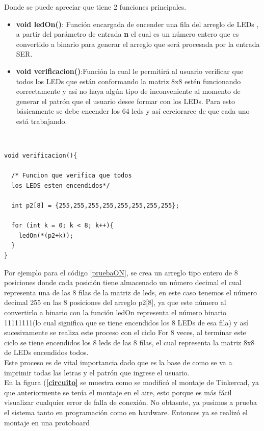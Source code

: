 \documentclass{article}
\begin{document}
Donde se puede apreciar que tiene 2 funciones principales.

\begin{itemize}
    \item \textbf{ void ledOn()}: Función encargada de encender una fila del arreglo de LEDs , a partir del parámetro de entrada \textbf{n} el cual es un número entero que es convertido a binario para generar el arreglo que será procesada por la entrada SER.
    \item \textbf{void verificacion()}:Función la cual le permitirá al usuario verificar que todos los LEDs que están conformando la matriz 8x8 estén funcionando correctamente  y así no haya algún tipo de inconveniente al momento de generar el patrón que el usuario desee formar con los LEDs. Para esto básicamente se debe encender los 64 leds y así cerciorarce de que  cada uno está trabajando.
    
\end{itemize}
\\

\begin{lstlisting}[language=arduino, label=pruebaON]
void verificacion(){ 
  
  /* Funcion que verifica que todos 
  los LEDS esten encendidos*/
  
  int p2[8] = {255,255,255,255,255,255,255,255};
  
  for (int k = 0; k < 8; k++){
    ledOn(*(p2+k));
  }
}
\end{lstlisting}

Por ejemplo para el código \ref{pruebaON}, se crea un arreglo tipo entero de 8 posiciones donde cada posición tiene almacenado un número decimal el cual representa una de las 8 filas de la matriz de leds, en este caso tenemos el número decimal 255 en las 8 posiciones del arreglo p2[8], ya que este número al convertirlo a binario con la función ledOn  representa el número binario 11111111(lo cual significa que se tiene encendidos los 8 LEDs de esa fila) y así sucesivamente se realiza este proceso con el ciclo For 8 veces, al  terminar este ciclo se tiene encendidos los 8 leds de las 8 filas, el cual representa la matriz 8x8 de LEDs encendidos todos.\\

Este proceso es de vital importancia dado que es la base de como se va a imprimir todas las letras y el patrón que ingrese el usuario.\\

En la figura (\textbf{\ref{circuito}} se muestra como se modificó el montaje de Tinkercad, ya que anteriormente se tenía el montaje en el aire, esto porque es más fácil visualizar cualquier error de falla de conexión. No obtasnte, ya pusimos a prueba el sistema tanto en programación como en hardware. Entonces ya se realizó el montaje en una protoboard
\end{document}
